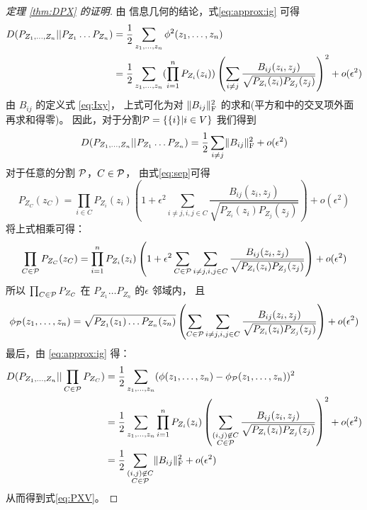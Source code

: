 \begin{proof}[定理 \ref{thm:DPX} 的证明]
由 信息几何的结论，式\eqref{eq:approx:ig} 可得
\begin{align*}
D(P_{Z_1,\dots, Z_n}|| P_{Z_1}\dots P_{Z_n}) & ={1 \over 2} \sum_{z_1,\dots,z_n}\phi^2(z_1,\dots, z_n) \\
& = {1\over 2}\sum_{z_1,\dots,z_n} (\prod_{i=1}^n  P_{Z_i} (z_i)) \left(\sum_{i\neq j}{B_{ij}(z_i, z_j) \over \sqrt{P_{Z_i}(z_i)P_{Z_j}(z_j)} }\right)^2 +o(\epsilon^2) 
\end{align*}
由 $B_{ij}$
的定义式 \eqref{eq:Ixy}，
上式可化为对 $\norm{B_{ij}}^2_{\mathrm{F}}$
的求和(平方和中的交叉项外面再求和得零)。
因此，对于分割$\P=\{\{i\}|i\in V\}$ 我们得到
\begin{equation}
D(P_{Z_1,\dots, Z_n}|| P_{Z_1}\dots P_{Z_n}) =   {1 \over 2} \sum_{i\neq j} \norm{B_{ij}}^2_{\mathrm{F}} + o(\epsilon^2)
\end{equation}
对于任意的分割 $\P$，$C\in \P$，
由式\eqref{eq:sep}可得
\begin{equation}
P_{Z_C}(z_C) = \prod_{i\in C} P_{Z_i}(z_i)
\left(1 + \epsilon^2 \sum_{i\neq j,i,j\in C} \frac{B_{ij}(z_i, z_j)}{\sqrt{P_{Z_i}(z_i)P_{Z_j}(z_j)}}
\right) + o(\epsilon^2)
\end{equation}
将上式相乘可得：
\begin{equation}
\prod_{C\in \P}P_{Z_C}(z_C) = \prod_{i=1}^n P_{Z_i}(z_i)
\left(1+\epsilon^2 \sum_{C\in\P}\sum_{i\neq j,i,j\in C}\frac{B_{ij}(z_i, z_j)}{\sqrt{P_{Z_i}(z_i)P_{Z_j}(z_j)}}
\right) + o(\epsilon^2)
\end{equation}
所以 $\prod_{C\in \P}P_{Z_C}$ 在 $P_{Z_1}\dots P_{Z_n}$ 的$\epsilon$ 邻域内，
且 $$\phi_{\P}(z_1,\dots, z_n)=
\sqrt{P_{Z_1}(z_1)\dots P_{Z_n}(z_n)}\left(\sum_{C\in\P}\sum_{i\neq j,i,j\in C}\frac{B_{ij}(z_i, z_j)}{\sqrt{P_{Z_i}(z_i)P_{Z_j}(z_j)}}\right)+o(\epsilon^2)$$
最后，由  \eqref{eq:approx:ig} 得：
\begin{align*}
D(P_{Z_1,\dots, Z_n}|| \prod_{C\in \P}P_{Z_C}) & ={1 \over 2} \sum_{z_1,\dots,z_n}(\phi(z_1,\dots, z_n)-\phi_{\P}(z_1, \dots, z_n))^2 \\
& = {1\over 2}\sum_{z_1,\dots,z_n} \prod_{i=1}^n  P_{Z_i} (z_i) \left(\sum_{\substack{(i,j) \not\in C\\ C\in \P}} {B_{ij}(z_i, z_j) \over \sqrt{P_{Z_i}(z_i)P_{Z_j}(z_j)} }\right)^2 +o(\epsilon^2) \\
& = \frac{1}{2} \sum_{\substack{(i,j) \not\in C\\ C\in \P}} \norm{B_{ij}}_{\mathrm{F}}^2 + o(\epsilon^2)
\end{align*}
从而得到式\eqref{eq:PXV}。
\end{proof}



